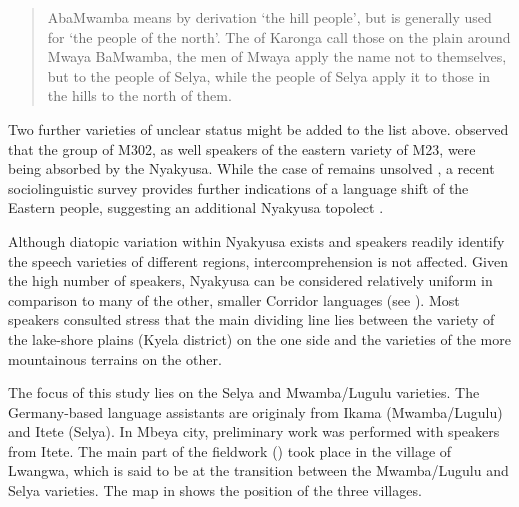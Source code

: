 \begin{quote}AbaMwamba means by derivation `the hill people', but is generally used for `the people of the north'. The  of Karonga call those on the plain around Mwaya BaMwamba, the men of Mwaya apply the name not to themselves, but to the people of Selya, while the people of Selya apply it to those in the hills to the north of them. \citep[2 FN2]{WilsonM1963}
\end{quote}
\largerpage[-2]
Two further varieties of unclear status might be added to the list above. \citet[9]{WilsonM1958} observed that the group of  M302, as well speakers of the eastern variety of  M23, were being absorbed by the Nyakyusa. While the case of  remains unsolved \citep[26]{WalshMSwillaI2002}, a recent sociolinguistic survey provides further indications of a language shift of the Eastern  people, suggesting an additional Nyakyusa topolect \citep{Lindforsetal2009}. 

Although diatopic variation within Nyakyusa exists and speakers readily identify the speech varieties of different regions, intercomprehension is not affected. Given the high number of speakers, Nyakyusa can be considered relatively uniform in comparison to many of the other, smaller Corridor languages (see \citealt[204]{LabroussiC1998}). Most speakers consulted stress that the main dividing line lies between the variety of the lake-shore plains (Kyela district) on the one side and the varieties of the more mountainous terrains on the other.

The focus of this study lies on the Selya and Mwamba/Lugulu varieties. The Germany-based language assistants are originaly from Ikama (Mwamba/Lugulu) and Itete (Selya). In Mbeya city, preliminary work was performed with speakers from Itete. The main part of the fieldwork () took place in the village of Lwangwa, which is said to be at the transition between the Mwamba/Lugulu and Selya varieties. The map in  shows the position of the three villages.

